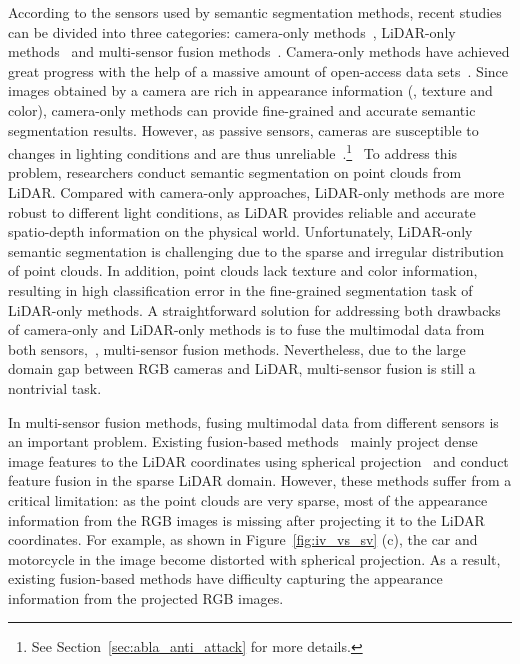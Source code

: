 \documentclass[10pt,twocolumn,letterpaper]{article}
\newcommand{\ice}[1]{{\color{black}#1}}
\newcommand{\hu}[1]{{\color{black}#1}}
\begin{document}
According to the sensors used by semantic segmentation methods, recent studies can be divided into three categories: camera-only methods~\cite{Badrinarayanan2017SegNetAD,chen2017deeplab,chen2017rethinking,Long2015FullyCN,yuan2018ocnet}, LiDAR-only methods~\cite{aksoy2019salsanet,cortinhal2020salsanext,hu2020randla,wu2018squeezeseg,zhang2020polarnet} and multi-sensor fusion methods~\cite{krispel2020fuseseg,Madawy2019RGBAL,meyer2019sensor,vora2020pointpainting,zhang2020deep}. Camera-only methods have achieved great progress with the help of a massive amount of open-access data sets~\cite{brostow2008segmentation,cordts2016cityscapes,Dollar2012PAMI}. Since images obtained by a camera are rich in appearance information (\eg, texture and color), camera-only methods can provide fine-grained and accurate semantic segmentation results. However, \hu{as passive sensors, cameras are susceptible to changes in lighting conditions and are thus unreliable~\cite{sitawarin2018darts}.\footnote{See Section~\ref{sec:abla_anti_attack} for more details.}}
~\ice{To address this problem, researchers conduct semantic segmentation on point clouds from LiDAR.
Compared with camera-only approaches, LiDAR-only methods are more robust to different light conditions, as LiDAR provides reliable and accurate spatio-depth information on the physical world.}
Unfortunately, LiDAR-only semantic segmentation is challenging due to the sparse and irregular distribution of point clouds. In addition, point clouds lack texture and color information, resulting in high classification error in the fine-grained segmentation task of LiDAR-only methods. 
A straightforward solution for addressing both drawbacks of camera-only and LiDAR-only methods is to fuse the multimodal data from both sensors,~\ie, multi-sensor fusion methods. Nevertheless, due to the large domain gap between RGB cameras and LiDAR, multi-sensor fusion is still a nontrivial task.


In multi-sensor fusion methods, fusing multimodal data from different sensors is an important problem. \ice{Existing fusion-based methods~\cite{Madawy2019RGBAL,vora2020pointpainting} mainly project dense image features to the LiDAR coordinates using spherical projection~\cite{milioto2019rangenet++} and conduct feature fusion in the sparse LiDAR domain. However, these methods suffer from a critical limitation: as the point clouds are very sparse, most of the appearance information from the RGB images is missing after projecting it to the LiDAR coordinates. For example, as shown in Figure~\ref{fig:iv_vs_sv} (c), the car and motorcycle in the image become distorted with spherical projection. As a result, existing fusion-based methods have difficulty capturing the appearance information from the projected RGB images.}
\end{document}
